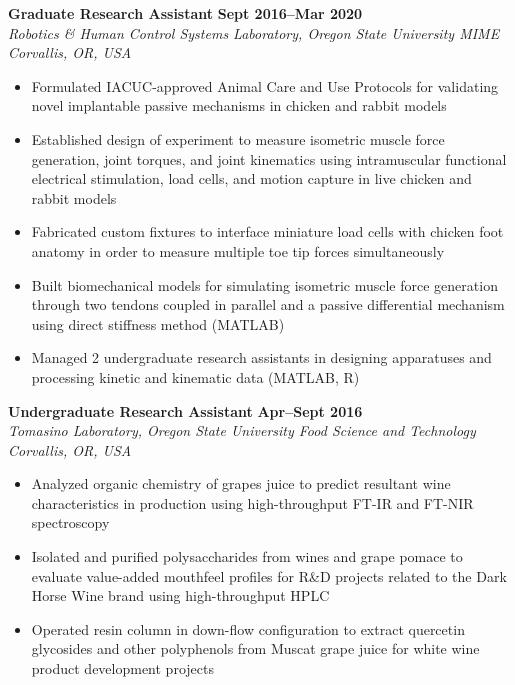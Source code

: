 \documentclass[10pt]{letter}
\begin{document}
\textbf{Graduate Research Assistant}
\hfill
\textbf{Sept 2016--Mar 2020} \\
\textit{Robotics \& Human Control Systems Laboratory, Oregon State University MIME}
\hfill
\textit{Corvallis, OR, USA} \\
\vspace{2pt}
{\small
\begin{itemize}
    \item Formulated IACUC-approved Animal Care and Use Protocols for validating novel implantable passive mechanisms in chicken and rabbit models
    \item Established design of experiment to measure isometric muscle force generation, joint torques, and joint kinematics using intramuscular functional electrical stimulation, load cells, and motion capture in live chicken and rabbit models
    \item Fabricated custom fixtures to interface miniature load cells with chicken foot anatomy in order to measure multiple toe tip forces simultaneously
    \item Built biomechanical models for simulating isometric muscle force generation through two tendons coupled in parallel and a passive differential mechanism using direct stiffness method (MATLAB)
    \item Managed 2 undergraduate research assistants in designing apparatuses and processing kinetic and kinematic data (MATLAB, R)
\end{itemize}}
\vspace{10pt}


\textbf{Undergraduate Research Assistant}
\hfill
\textbf{Apr--Sept 2016} \\
\textit{Tomasino Laboratory, Oregon State University Food Science and Technology }
\hfill
\textit{Corvallis, OR, USA} \\
\vspace{2pt}
{\small
\begin{itemize}
    \item Analyzed organic chemistry of grapes juice to predict resultant wine characteristics in production using high-throughput FT-IR and FT-NIR spectroscopy
    \item Isolated and purified polysaccharides from wines and grape pomace to evaluate value-added mouthfeel profiles for R\&D projects related to the Dark Horse Wine brand using high-throughput HPLC
    \item Operated resin column in down-flow configuration to extract quercetin glycosides and other polyphenols from Muscat grape juice for white wine product development projects
\end{itemize}}
\end{document}

